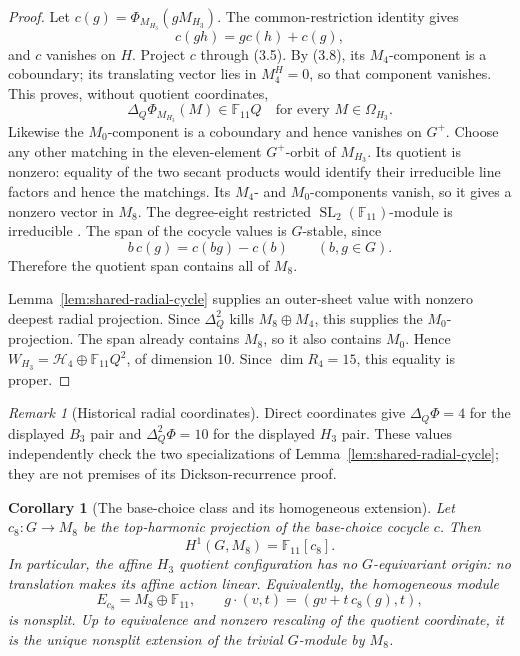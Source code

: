 \documentclass[11pt]{article}
\newtheorem{corollary}[theorem]{Corollary}
\theoremstyle{definition}
\theoremstyle{remark}
\newtheorem{remark}[theorem]{Remark}
\newcommand{\F}{\mathbb{F}}
\begin{document}
\begin{proof}
Let \(c(g)=\Phi_{M_{H_3}}(gM_{H_3})\).  The common-restriction identity
gives
\[
 c(gh)=g c(h)+c(g),
\]
and \(c\) vanishes on \(H\).  Project \(c\) through (3.5).  By (3.8), its
\(M_4\)-component is a coboundary; its translating vector lies in
\(M_4^H=0\), so that component vanishes.  This proves, without quotient
coordinates,
\[
 \Delta_Q\Phi_{M_{H_3}}(M)\in\F_{11}Q
 \quad\text{for every }M\in\Omega_{H_3}.            \tag{3.10}
\]
Likewise the \(M_0\)-component is a coboundary and hence vanishes on
\(G^+\).  Choose any other matching in the eleven-element \(G^+\)-orbit
of \(M_{H_3}\).  Its quotient is nonzero: equality of the two secant
products would identify their irreducible line factors and hence the
matchings.  Its \(M_4\)- and \(M_0\)-components vanish, so it gives a
nonzero vector in \(M_8\).  The degree-eight restricted
\(\operatorname{SL}_2(\F_{11})\)-module is irreducible
\cite[Fact~3.1]{BraunNebe2025}.  The span of the cocycle values is
\(G\)-stable, since
\[
 b\,c(g)=c(bg)-c(b)\qquad(b,g\in G).
\]
Therefore the quotient span contains all of \(M_8\).

Lemma~\ref{lem:shared-radial-cycle} supplies an outer-sheet value with
nonzero deepest radial projection.  Since \(\Delta_Q^2\) kills
\(M_8\oplus M_4\), this supplies the \(M_0\)-projection.  The span
already contains \(M_8\), so it also contains \(M_0\).  Hence
\(W_{H_3}=\mathcal H_4\oplus\F_{11}Q^2\), of dimension \(10\).
Since \(\dim R_4=15\), this equality is proper.
\end{proof}

\begin{remark}[Historical radial coordinates]
\label{rem:historical-radial-scalars}
Direct coordinates give \(\Delta_Q\Phi=4\) for the displayed \(B_3\)
pair and \(\Delta_Q^2\Phi=10\) for the displayed \(H_3\) pair.  These
values independently check the two specializations of
Lemma~\ref{lem:shared-radial-cycle}; they are not premises of its
Dickson-recurrence proof.
\end{remark}

\begin{corollary}[The base-choice class and its homogeneous extension]
\label{cor:h3-affine-origin}
Let \(c_8:G\to M_8\) be the top-harmonic projection of the base-choice
cocycle \(c\).  Then
\[
 H^1(G,M_8)=\F_{11}[c_8].                              \tag{3.11a}
\]
In particular, the affine \(H_3\) quotient configuration has no
\(G\)-equivariant origin: no translation makes its affine action linear.
Equivalently, the homogeneous module
\[
 E_{c_8}=M_8\oplus\F_{11},\qquad
 g\cdot(v,t)=(gv+t\,c_8(g),t),                         \tag{3.11b}
\]
is nonsplit.  Up to equivalence and nonzero rescaling of the quotient
coordinate, it is the unique nonsplit extension of the trivial
\(G\)-module by \(M_8\).
\end{corollary}
\end{document}
